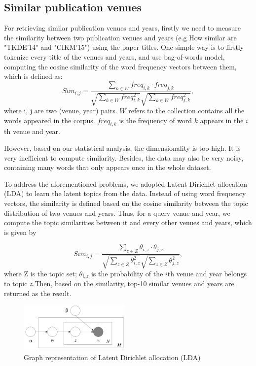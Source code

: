 \documentclass{sig-alternate-05-2015}
\begin{document}
\subsection{Similar publication venues}
For retrieving similar publication venues and years, firstly we need to measure the similarity between two publication venues and years (e.g How similar are "TKDE'14" and "CIKM'15") using the paper titles. One simple way is to firstly tokenize every title of the venues and years, and use bag-of-words model, computing the cosine similarity of the word frequency vectors between them, which is defined as:
\begin{equation*}
  Sim_{i, j} = \frac{\sum_{k\in W}freq_{i,k} \cdot freq_{j,k}}{\sqrt{\sum_{k\in W}freq_{i,k}^2}\sqrt{\sum_{k\in W}freq_{j,k}^2}},
\end{equation*}
where i, j are two (venue, year) pairs. $W$ refers to the collection contains all the words appeared in the corpus. $freq_{i,k}$ is the frequency of word $k$ appears in the $i$th venue and year.

However, based on our statistical analysis, the dimensionality is too high. It is very inefficient to compute similarity. Besides, the data may also be very noisy, containing many words that only appears once in the whole dataset.

To address the aforementioned problems, we adopted Latent Dirichlet allocation (LDA)\cite{blei2003latent} to learn the latent topics from the data. Instead of using word frequency vectors, the similarity is defined based on the cosine similarity between the topic distribution of two venues and years. Thus, for a query venue and year, we compute the topic similarities between it and every other venues and years, which is given by

\begin{equation*}
  Sim_{i, j} = \frac{\sum_{z\in Z}\theta_{i,z} \cdot \theta_{j,z}}{\sqrt{\sum_{z\in Z}\theta_{i,z}^2}\sqrt{\sum_{z\in Z}\theta_{j,z}^2}},
\end{equation*}
where Z is the topic set; $\theta_{i,z}$ is the probability of the $i$th venue and year belongs to topic $z$.Then, based on the similarity, top-10 similar venues and years are returned as the result.

\begin{figure}[th]
\centering
\includegraphics[width=0.48\textwidth]{img/LDA}
\caption{Graph representation of Latent Dirichlet allocation (LDA)}
\label{fig:lda}
\end{figure}
\end{document}
